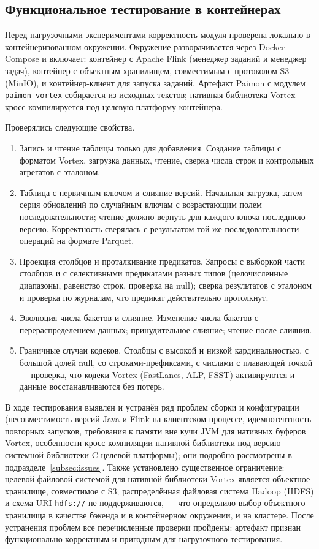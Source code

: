 \subsection{Функциональное тестирование в контейнерах}

Перед нагрузочными экспериментами корректность модуля проверена локально в
контейнеризованном окружении. Окружение разворачивается через Docker Compose и
включает: контейнер с Apache Flink (менеджер заданий и менеджер задач), контейнер с
объектным хранилищем, совместимым с протоколом S3 (MinIO), и контейнер-клиент для
запуска заданий. Артефакт Paimon с модулем \texttt{paimon-vortex} собирается из
исходных текстов; нативная библиотека Vortex кросс-компилируется под целевую
платформу контейнера.

Проверялись следующие свойства.

\begin{enumerate}
    \item Запись и чтение таблицы только для добавления. Создание таблицы с
        форматом Vortex, загрузка данных, чтение, сверка числа строк и контрольных
        агрегатов с эталоном.
    \item Таблица с первичным ключом и слияние версий. Начальная загрузка,
        затем серия обновлений по случайным ключам с возрастающим полем
        последовательности; чтение должно вернуть для каждого ключа последнюю версию.
        Корректность сверялась с результатом той же последовательности операций на
        формате Parquet.
    \item Проекция столбцов и проталкивание предикатов. Запросы с выборкой
        части столбцов и с селективными предикатами разных типов (целочисленные
        диапазоны, равенство строк, проверка на null); сверка результатов с эталоном
        и проверка по журналам, что предикат действительно протолкнут.
    \item Эволюция числа бакетов и слияние. Изменение числа бакетов с
        перераспределением данных; принудительное слияние; чтение после слияния.
    \item Граничные случаи кодеков. Столбцы с высокой и низкой
        кардинальностью, с большой долей null, со строками-префиксами, с числами с
        плавающей точкой --- проверка, что кодеки Vortex (FastLanes, ALP, FSST)
        активируются и данные восстанавливаются без потерь.
\end{enumerate}

В ходе тестирования выявлен и устранён ряд проблем сборки и конфигурации (несовместимость
версий Java и Flink на клиентском процессе, идемпотентность повторных запусков,
требования к памяти вне кучи JVM для нативных буферов Vortex, особенности
кросс-компиляции нативной библиотеки под версию системной библиотеки C целевой
платформы); они подробно рассмотрены в подразделе~\ref{subsec:issues}. Также
установлено существенное ограничение: целевой файловой системой для нативной
библиотеки Vortex является объектное хранилище, совместимое с S3; распределённая
файловая система Hadoop (HDFS) и схема URI \texttt{hdfs://} не поддерживаются, ---
что определило выбор объектного хранилища в качестве бэкенда и в контейнерном
окружении, и на кластере. После устранения проблем все перечисленные проверки
пройдены: артефакт признан функционально корректным и пригодным для нагрузочного
тестирования.
